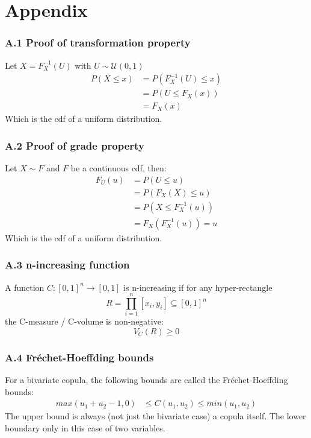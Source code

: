 \documentclass{beamer}
\begin{document}
\section{Appendix} 
\frame{\sectionpage}
\begin{frame}
\frametitle{A.1 Proof of transformation property}
Let $X = F_{X}^{-1}(U)$ with $U \sim \mathcal{U} (0, 1)$
\begin{align}
P(X \leq x) &= P(F_{X}^{-1}(U) \leq x) \\ &= P(U \leq F_{X}(x)) \\ &= F_{X}(x) 
\end{align}
Which is the cdf of a uniform distribution.

\end{frame}


\begin{frame}
\frametitle{A.2 Proof of grade property}
Let $X \sim F$ and $F$ be a continuous cdf, then:
\begin{align}
F_{U}(u) &= P(U \leq u) \\ &= P(F_{X}(X) \leq u) \\ &= P(X \leq F_{X}^{-1}(u)) \\ &= F_{X}(F_{X}^{-1}(u)) = u 
\end{align}
Which is the cdf of a uniform distribution.

\end{frame}


\begin{frame}
\frametitle{A.3 n-increasing function}
A function $C: [0, 1]^n \rightarrow [0, 1]$ is n-increasing if for any hyper-rectangle \[R = \prod_{i=1}^{n} [x_i, y_i] \subseteq [0, 1]^n\]
the C-measure / C-volume is non-negative:
\[V_{C}(R) \geq 0\]

\end{frame}


\begin{frame}
\frametitle{A.4 Fréchet-Hoeffding bounds}
For a bivariate copula, the following bounds are called the Fréchet-Hoeffding bounds:
\begin{align}
max(u_1 + u_2 - 1, 0)  &\leq C(u_1, u_2) \leq min(u_1, u_2)
\end{align}
The upper bound is always (not just the bivariate case) a copula itself. The lower boundary only in this case of two variables.

\end{frame}
\end{document}

